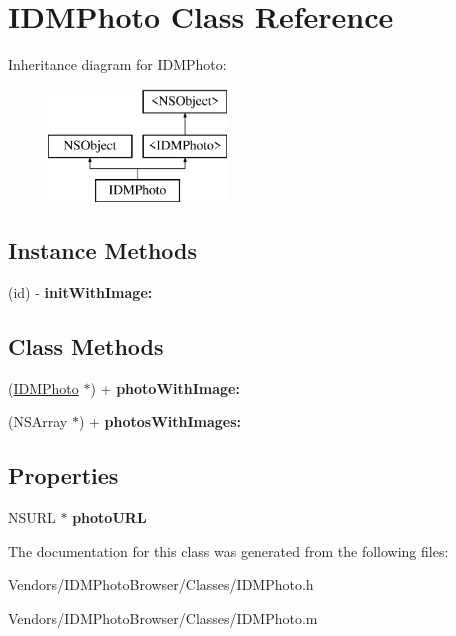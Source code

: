 \hypertarget{interface_i_d_m_photo}{}\section{I\+D\+M\+Photo Class Reference}
\label{interface_i_d_m_photo}
Inheritance diagram for I\+D\+M\+Photo\+:\begin{figure}[H]
\begin{center}
\leavevmode
\includegraphics[height=3.000000cm]{interface_i_d_m_photo}
\end{center}
\end{figure}
\subsection*{Instance Methods}
\begin{DoxyCompactItemize}
\item 
\hypertarget{interface_i_d_m_photo_a18fc6409d4e661b902d1a0d72b42e1f0}{}(id) -\/ {\bfseries init\+With\+Image\+:}\label{interface_i_d_m_photo_a18fc6409d4e661b902d1a0d72b42e1f0}

\end{DoxyCompactItemize}
\subsection*{Class Methods}
\begin{DoxyCompactItemize}
\item 
\hypertarget{interface_i_d_m_photo_a70cb6c3f88de92fba14e4c46284f1655}{}(\hyperlink{interface_i_d_m_photo}{I\+D\+M\+Photo} $\ast$) + {\bfseries photo\+With\+Image\+:}\label{interface_i_d_m_photo_a70cb6c3f88de92fba14e4c46284f1655}

\item 
\hypertarget{interface_i_d_m_photo_a2cfa1487ab0af041e614391f61ad1cb1}{}(N\+S\+Array $\ast$) + {\bfseries photos\+With\+Images\+:}\label{interface_i_d_m_photo_a2cfa1487ab0af041e614391f61ad1cb1}

\end{DoxyCompactItemize}
\subsection*{Properties}
\begin{DoxyCompactItemize}
\item 
\hypertarget{interface_i_d_m_photo_a9dad6796037cc849ed0d47bd623f7788}{}N\+S\+U\+R\+L $\ast$ {\bfseries photo\+U\+R\+L}\label{interface_i_d_m_photo_a9dad6796037cc849ed0d47bd623f7788}

\end{DoxyCompactItemize}


The documentation for this class was generated from the following files\+:\begin{DoxyCompactItemize}
\item 
Vendors/\+I\+D\+M\+Photo\+Browser/\+Classes/I\+D\+M\+Photo.\+h\item 
Vendors/\+I\+D\+M\+Photo\+Browser/\+Classes/I\+D\+M\+Photo.\+m\end{DoxyCompactItemize}
